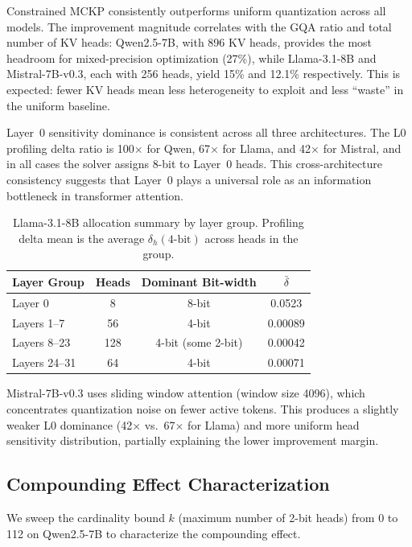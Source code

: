 \documentclass[11pt,a4paper]{article}
\begin{document}
Constrained MCKP consistently outperforms uniform quantization across all models.
The improvement magnitude correlates with the GQA ratio and total number of KV heads: Qwen2.5-7B, with 896 KV heads, provides the most headroom for mixed-precision optimization (27\%), while Llama-3.1-8B and Mistral-7B-v0.3, each with 256 heads, yield 15\% and 12.1\% respectively.
This is expected: fewer KV heads mean less heterogeneity to exploit and less ``waste'' in the uniform baseline.

Layer~0 sensitivity dominance is consistent across all three architectures.
The L0 profiling delta ratio is 100$\times$ for Qwen, 67$\times$ for Llama, and 42$\times$ for Mistral, and in all cases the solver assigns 8-bit to Layer~0 heads.
This cross-architecture consistency suggests that Layer~0 plays a universal role as an information bottleneck in transformer attention.

\begin{table}[t]
\centering
\small
\caption{Llama-3.1-8B allocation summary by layer group. Profiling delta mean is the average $\delta_h(4\text{-bit})$ across heads in the group.}
\label{tab:llama_alloc}
\begin{tabular}{lccc}
\toprule
\textbf{Layer Group} & \textbf{Heads} & \textbf{Dominant Bit-width} & \textbf{$\bar{\delta}$} \\
\midrule
Layer 0    &   8  & 8-bit & 0.0523 \\
Layers 1--7  &  56  & 4-bit & 0.00089 \\
Layers 8--23 & 128  & 4-bit (some 2-bit) & 0.00042 \\
Layers 24--31 & 64  & 4-bit & 0.00071 \\
\bottomrule
\end{tabular}
\end{table}

Mistral-7B-v0.3 uses sliding window attention (window size 4096), which concentrates quantization noise on fewer active tokens.
This produces a slightly weaker L0 dominance (42$\times$ vs.\ 67$\times$ for Llama) and more uniform head sensitivity distribution, partially explaining the lower improvement margin.

\subsection{Compounding Effect Characterization}
\label{sec:compounding}

We sweep the cardinality bound $k$ (maximum number of 2-bit heads) from 0 to 112 on Qwen2.5-7B to characterize the compounding effect.
\end{document}
